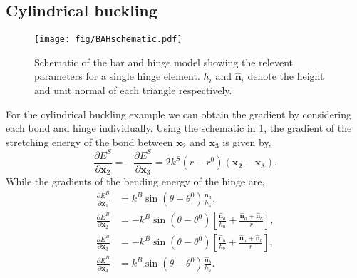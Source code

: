 \documentclass[aps,prl]{revtex4}
\begin{document}
\subsection{Cylindrical buckling}
\begin{figure}[htb]
  \texttt{[image: fig/BAHschematic.pdf]}
  \caption{\label{fig:BAHschematic}
    Schematic of the bar and hinge model showing the relevent parameters for a single hinge element. $h_i$ and $\bm{\hat{n}}_i$ denote the height and unit normal of each triangle respectively.
  }
\end{figure}
For the cylindrical buckling example we can obtain the gradient by considering each bond and hinge individually.
Using the schematic in \cref{fig:BAHschematic}, the gradient of the stretching energy of the bond between $\bm{x}_2$ and $\bm{x}_3$ is given by,
\begin{equation}
  \frac{\partial E^S}{\partial \bm{x}_2} = - \frac{\partial E^S}{\partial \bm{x}_3} = 
    2 k^S (r - r^0) (\bm{x_2} - \bm{x_3}).
\end{equation}
While the gradients of the bending energy of the hinge are,
\begin{align}
  \frac{\partial E^B}{\partial \bm{x}_1} &= k^B \sin(\theta - \theta^0) \frac{\bm{\hat{n}}_a}{h_a}, \\
  \frac{\partial E^B}{\partial \bm{x}_2} &= - k^B \sin(\theta - \theta^0) \left[\frac{\bm{\hat{n}}_a}{h_a} + \frac{\bm{\hat{n}}_a + \bm{\hat{n}}_b}{r}\right], \\
  \frac{\partial E^B}{\partial \bm{x}_3} &= - k^B \sin(\theta - \theta^0) \left[\frac{\bm{\hat{n}}_b}{h_b} + \frac{\bm{\hat{n}}_a + \bm{\hat{n}}_b}{r}\right], \\
  \frac{\partial E^B}{\partial \bm{x}_4} &= k^B \sin(\theta - \theta^0) \frac{\bm{\hat{n}}_b}{h_b}.
\end{align}
\end{document}
